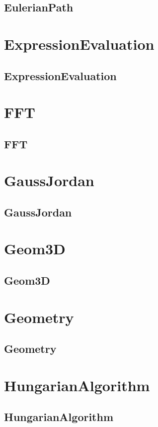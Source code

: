 \documentclass[a4paper, twocolumn]{article}
\begin{document}
\subsection{EulerianPath}

\section{ExpressionEvaluation}
\subsection{ExpressionEvaluation}

\section{FFT}
\subsection{FFT}

\section{GaussJordan}
\subsection{GaussJordan}

\section{Geom3D}
\subsection{Geom3D}

\section{Geometry}
\subsection{Geometry}

\section{HungarianAlgorithm}
\subsection{HungarianAlgorithm}

\end{document}
